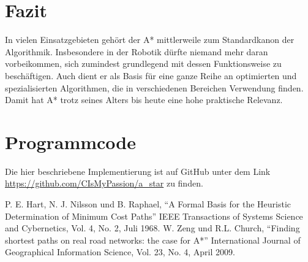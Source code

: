 \documentclass[10pt,twocolumn]{scrartcl}
\begin{document}
\section*{Fazit}

In vielen Einsatzgebieten gehört der A* mittlerweile zum Standardkanon der Algorithmik. Insbesondere in der Robotik dürfte niemand mehr daran vorbeikommen, sich zumindest grundlegend mit dessen Funktionsweise zu beschäftigen. Auch dient er als Basis für eine ganze Reihe an optimierten und spezialisierten Algorithmen, die in verschiedenen Bereichen Verwendung finden. Damit hat A* trotz seines Alters bis heute eine hohe praktische Relevanz.

\section*{Programmcode}

Die hier beschriebene Implementierung ist auf GitHub unter dem Link \url{https://github.com/CIsMyPassion/a\_star} zu finden.



\begin{thebibliography}{99}
 P. E. Hart, N. J. Nilsson und B. Raphael, ``A Formal Basis for the Heuristic Determination of Minimum Cost Paths'' IEEE Transactions of Systems  Science and Cybernetics, Vol. 4, No. 2, Juli 1968.
 W. Zeng und R.L. Church, ``Finding shortest paths on real road networks: the case for A*'' International Journal of Geographical Information Science, Vol. 23, No. 4, April 2009.

\end{thebibliography}
\end{document}
